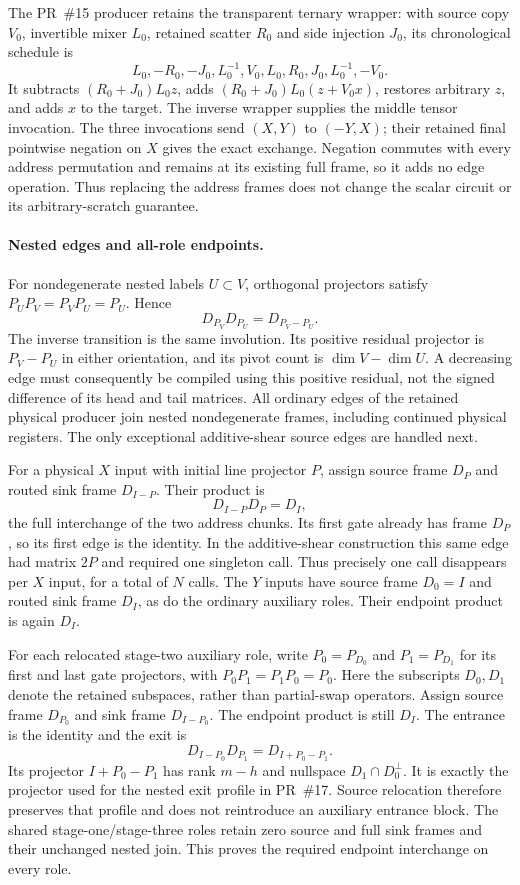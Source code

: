 The PR~\#15 producer retains the transparent ternary wrapper: with
source copy $V_0$, invertible mixer $L_0$, retained scatter $R_0$ and
side injection $J_0$, its chronological schedule is
\[
 L_0,-R_0,-J_0,L_0^{-1},V_0,L_0,R_0,J_0,L_0^{-1},-V_0.
\]
It subtracts $(R_0+J_0)L_0z$, adds
$(R_0+J_0)L_0(z+V_0x)$, restores arbitrary $z$, and adds $x$ to the
target. The inverse wrapper supplies the middle tensor invocation.
The three invocations send $(X,Y)$ to $(-Y,X)$; their retained final
pointwise negation on $X$ gives the exact exchange. Negation commutes
with every address permutation and remains at its existing full frame,
so it adds no edge operation. Thus replacing the address frames does
not change the scalar circuit or its arbitrary-scratch guarantee.

\paragraph{Nested edges and all-role endpoints.}
For nondegenerate nested labels $U\subset V$, orthogonal projectors
satisfy $P_UP_V=P_VP_U=P_U$. Hence
\[
 D_{P_V}D_{P_U}=D_{P_V-P_U}.
\]
The inverse transition is the same involution. Its positive residual
projector is $P_V-P_U$ in either orientation, and its pivot count is
$\dim V-\dim U$. A decreasing edge must consequently be compiled
using this positive residual, not the signed difference of its head
and tail matrices. All ordinary edges of the retained physical producer
join nested nondegenerate frames, including continued physical registers.
The only exceptional additive-shear source edges are handled next.

For a physical $X$ input with initial line projector $P$, assign source
frame $D_P$ and routed sink frame $D_{I-P}$. Their product is
\[
 D_{I-P}D_P=D_I,
\]
the full interchange of the two address chunks. Its first gate already
has frame $D_P$, so its first edge is the identity. In the additive-shear
construction this same edge had matrix $2P$ and required one singleton
call. Thus precisely one call disappears per $X$ input, for a total of
$N$ calls. The $Y$ inputs have source frame $D_0=I$ and routed sink
frame $D_I$, as do the ordinary auxiliary roles. Their endpoint product
is again $D_I$.

For each relocated stage-two auxiliary role, write $P_0=P_{D_0}$ and
$P_1=P_{D_1}$ for its first and last gate projectors, with
$P_0P_1=P_1P_0=P_0$. Here the subscripts $D_0,D_1$ denote the retained
subspaces, rather than partial-swap operators. Assign source frame
$D_{P_0}$ and sink frame $D_{I-P_0}$. The endpoint product is still
$D_I$. The entrance is the identity and the exit is
\[
 D_{I-P_0}D_{P_1}=D_{I+P_0-P_1}.
\]
Its projector $I+P_0-P_1$ has rank $m-h$ and nullspace
$D_1\cap D_0^\perp$. It is exactly the projector used for the nested
exit profile in PR~\#17. Source relocation therefore preserves that
profile and does not reintroduce an auxiliary entrance block.
The shared stage-one/stage-three roles retain zero source and full
sink frames and their unchanged nested join. This proves the required
endpoint interchange on every role.

